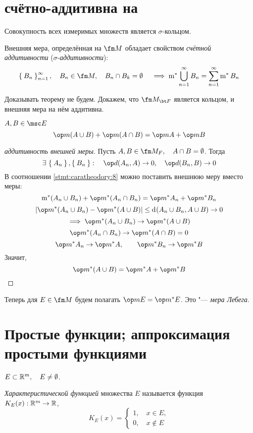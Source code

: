 \section{ счётно-аддитивна на }

\begin{theorem}
	Совокупность всех измеримых множеств является $ \sigma $-кольцом.

	Внешняя мера, определённая на $ \fm M $ обладает свойством \emph{счётной аддитивности} ($ \sigma $-\emph{аддитивности}):
	$$ \set{B_n}_{n = 1}^\infty, \quad B_n \in \fm M, \quad B_n \cap B_k = \O \quad \implies \operatorname m^* \bigcup_{n = 1}^\infty B_n = \sum_{n = 1}^\infty \operatorname m^* B_n $$
\end{theorem}

Доказывать теорему не будем. Докажем, что $ \fm M_{\bt F} $ является кольцом, и внешняя мера на нём аддитивна.

\begin{statement}\label{stmt:caratheodory:8}
	$ A, B \in \msc E $
	$$ \op m(A \cup B) + \op m(A \cap B) = \op m A + \op m B $$
\end{statement}

\vspace{0.5em}

\begin{proof}[аддитивность внешней меры]
	Пусть $ A, B \in \fm M_F, \quad A \cap B = \O $. Тогда
	$$ \exist \set{A_n}, \set{B_n} : \quad \op d(A_n, A) \to 0, \quad \op d(B_n, B) \to 0 $$
	В соотношении \ref{stmt:caratheodory:8} можно поставить внешнюю меру вместо меры:
	$$ \operatorname m^*(A_n \cup B_n) + \op m^*(A_n \cap B_n) = \op m^* A_n + \op m^* B_n $$
	$$ | \op m^* (A_n \cup B_n) - \op m^* (A \cup B) | \le \di (A_n \cup B_n, A \cup B) \to 0 $$
	$$ \implies \op m^*(A_n \cup B_n) \to \op m^*(A \cup B) $$
	$$ \op m^*(A_n \cap B_n) \to \op m^*(A \cap B) = 0 $$
	$$ \op m^* A_n \to \op m^* A, \qquad \op m^* B_n \to \op m^* B $$
	Значит,
	$$ \op m^*(A \cup B) = \op m^* A + \op m^* B $$
\end{proof}

Теперь для $ E \in \fm M $ будем полагать $ \op m E = \op m^* E $. Это "--- \emph{мера Лебега}.

\section{Простые функции; аппроксимация простыми функциями}

\begin{definition}
	$ E \subset \mathbb{R}^m, \quad E \ne \emptyset $.

	\emph{Характеристической функцией} множества $ E $ называется функция $ K_E(x) : \mathbb{R}^m \to \mathbb{R} $,
	$$ K_E(x) =
	\begin{cases}
		1, \quad x \in E, \\
		0, \quad x \not\in E
	\end{cases} $$
\end{definition}

